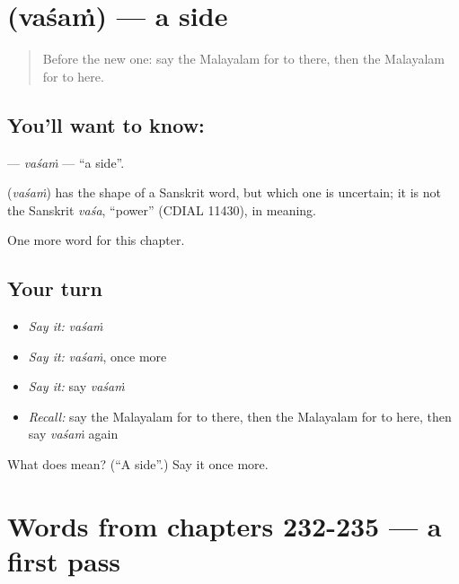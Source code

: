 \section[\texorpdfstring{\ml{വശം} (vaśaṁ)}{വശം (vaśaṁ)}]{ (vaśaṁ) — a side}

\label{lesson:ML-C240-vasam}



\begin{quote}
Before the new one: say the Malayalam for to there, then the Malayalam for to here.
\end{quote}

\subsection*{You'll want to know: }
\textbf{} — \emph{vaśaṁ} — \textquotedblleft{}a side\textquotedblright{}.

\begin{cousinweb}
\textbf{} (\emph{vaśaṁ}) has the shape of a Sanskrit word, but which one is uncertain; it is not the Sanskrit \emph{vaśa}, \textquotedblleft{}power\textquotedblright{} (CDIAL 11430), in meaning.
\end{cousinweb}

\begin{grammarlens}[title={What you've built}]
One more word for this chapter.
\end{grammarlens}

\subsection*{Your turn}
\begin{itemize}
\raggedright
  \item \emph{Say it:} \emph{vaśaṁ}
  \item \emph{Say it:} \emph{vaśaṁ}, once more
  \item \emph{Say it:} say \emph{vaśaṁ}
  \item \emph{Recall:} say the Malayalam for to there, then the Malayalam for to here, then say \emph{vaśaṁ} again
\end{itemize}

\begin{tcolorbox}[breakable,colback=teal!4,colframe=teal!35!black,title={Before you move on}]
What does  mean? (\textquotedblleft{}A side\textquotedblright{}.) Say it once more.
\end{tcolorbox}
\section[(dialogue)]{Words from chapters 232-235 — a first pass}

